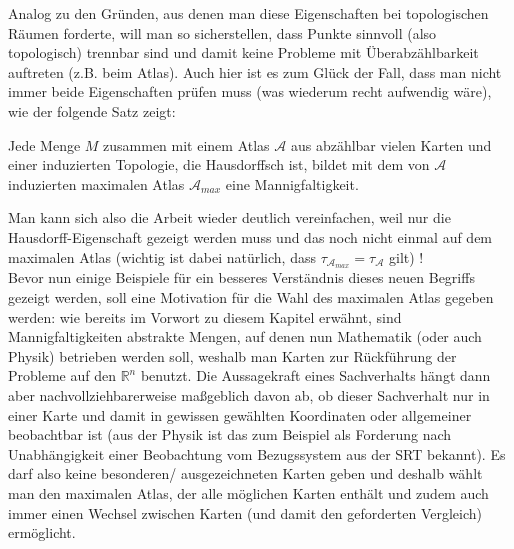 \documentclass[../H_Analysis_main.tex]{subfiles}
\begin{document}
Analog zu den Gründen, aus denen man diese Eigenschaften bei topologischen Räumen forderte, will man so sicherstellen, dass Punkte sinnvoll (also topologisch) trennbar sind und damit keine Probleme mit Überabzählbarkeit auftreten (z.B. beim Atlas). Auch hier ist es zum Glück der Fall, dass man nicht immer beide Eigenschaften prüfen muss (was wiederum recht aufwendig wäre), wie der folgende Satz zeigt:

\begin{satz}\label{satz:zweitabz}
Jede Menge $M$ zusammen mit einem Atlas $\mathcal{A}$ aus abzählbar vielen Karten und einer induzierten Topologie, die Hausdorffsch ist, bildet mit dem von $\mathcal{A}$ induzierten maximalen Atlas $\mathcal{A}_{max}$ eine Mannigfaltigkeit.
\end{satz}
Man kann sich also die Arbeit wieder deutlich vereinfachen, weil nur die Hausdorff-Eigenschaft gezeigt werden muss und das noch nicht einmal auf dem maximalen Atlas (wichtig ist dabei natürlich, dass $\tau_{\mathcal{A}_{max}} = \tau_\mathcal{A}$ gilt) !\\


Bevor nun einige Beispiele für ein besseres Verständnis dieses neuen Begriffs gezeigt werden, soll eine Motivation für die Wahl des maximalen Atlas gegeben werden: wie bereits im Vorwort zu diesem Kapitel erwähnt, sind Mannigfaltigkeiten abstrakte Mengen, auf denen nun Mathematik (oder auch Physik) betrieben werden soll, weshalb man Karten zur Rückführung der Probleme auf den $\mathbb{R}^n$ benutzt. Die Aussagekraft eines Sachverhalts hängt dann aber nachvollziehbarerweise maßgeblich davon ab, ob dieser Sachverhalt nur in einer Karte und damit in gewissen gewählten Koordinaten oder allgemeiner beobachtbar ist (aus der Physik ist das zum Beispiel als Forderung nach Unabhängigkeit einer Beobachtung vom Bezugssystem aus der SRT bekannt). Es darf also keine besonderen/ ausgezeichneten Karten geben und deshalb wählt man den maximalen Atlas, der alle möglichen Karten enthält und zudem auch immer einen Wechsel zwischen Karten (und damit den geforderten Vergleich) ermöglicht.
\end{document}

